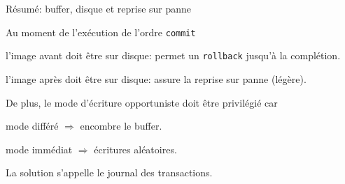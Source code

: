 \documentclass[aspectratio=169, handout]{beamer} %
\begin{document}
\begin{frame}{Résumé: buffer, disque et reprise sur panne}

Au moment de l'exécution de l'ordre \texttt{commit}


\begin{redbullet}

  \item \alert{l'image avant doit être sur disque}: permet un \texttt{rollback} jusqu'à la complétion.

  \item \alert{l'image après} doit être sur disque: assure la reprise sur panne  (légère).

\end{redbullet}

\vfill

De plus, le mode d'écriture opportuniste doit être privilégié car

\vfill

\begin{redbullet}

  \item  mode différé $\Rightarrow$ encombre le buffer.  

  \item  mode immédiat $\Rightarrow$  écritures aléatoires.

\end{redbullet}

\vfill

\begin{blocgauche}
La solution s'appelle le \alert{journal des transactions}.
\end{blocgauche}


\end{frame}
\end{document}
